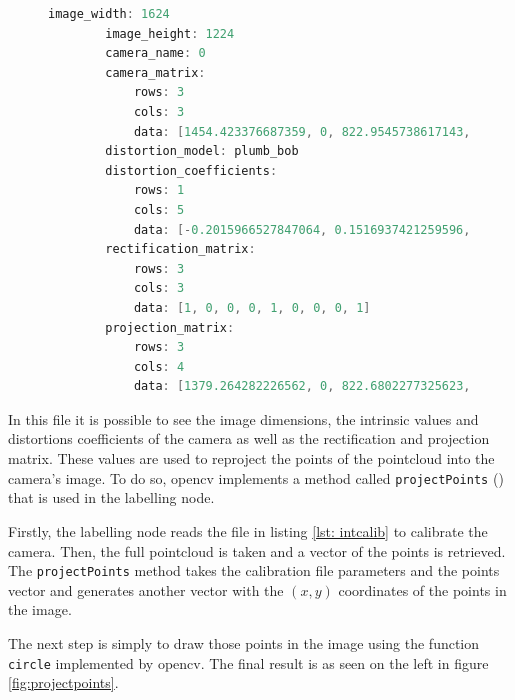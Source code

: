 \begin{figure}
	\begin{center}
		\begin{lstlisting}[caption={Intrinsic Calibration Result}, language=c++, label={lst: intcalib}]
		image_width: 1624
		image_height: 1224
		camera_name: 0
		camera_matrix:
			rows: 3
			cols: 3
			data: [1454.423376687359, 0, 822.9545738617143, 0, 1458.005828758985, 590.5652711935882, 0, 0, 1]
		distortion_model: plumb_bob
		distortion_coefficients:
			rows: 1
			cols: 5
			data: [-0.2015966527847064, 0.1516937421259596, -0.0009340794635090795, -0.0006787308984611241, 0]
		rectification_matrix:
			rows: 3
			cols: 3
			data: [1, 0, 0, 0, 1, 0, 0, 0, 1]
		projection_matrix:
			rows: 3
			cols: 4
			data: [1379.264282226562, 0, 822.6802277325623, 0, 0, 1410.231689453125, 588.4764252277164, 0, 0, 0, 1, 0]\end{lstlisting}
	\end{center}
\end{figure}

In this file it is possible to see the image dimensions, the intrinsic values and distortions coefficients of the camera as well as the rectification and projection matrix. These values are used to reproject the points of the pointcloud into the camera's image. To do so, \gls{opencv} implements a method called \texttt{projectPoints} (\cite{OpenCVa}) that is used in the labelling node. 

Firstly, the labelling node reads the file in listing \ref{lst: intcalib} to calibrate the camera. Then, the full pointcloud is taken and a vector of the points is retrieved. The \texttt{projectPoints} method takes the calibration file parameters and the points vector and generates another vector with the $(x,y)$ coordinates of the points in the image.

The next step is simply to draw those points in the image using the function \texttt{circle} implemented by \gls{opencv}. The final result is as seen on the left in figure \ref{fig:projectpoints}.


